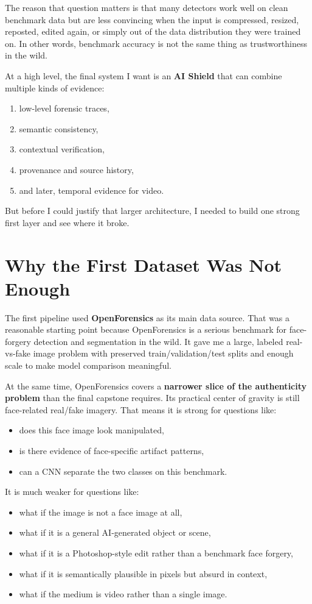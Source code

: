 \documentclass[11pt]{article}
\begin{document}
The reason that question matters is that many detectors work well on clean benchmark data but are less convincing when the input is compressed, resized, reposted, edited again, or simply out of the data distribution they were trained on. In other words, benchmark accuracy is not the same thing as trustworthiness in the wild.

At a high level, the final system I want is an \textbf{AI Shield} that can combine multiple kinds of evidence:
\begin{enumerate}[leftmargin=1.5em]
    \item low-level forensic traces,
    \item semantic consistency,
    \item contextual verification,
    \item provenance and source history,
    \item and later, temporal evidence for video.
\end{enumerate}

But before I could justify that larger architecture, I needed to build one strong first layer and see where it broke.

\section{Why the First Dataset Was Not Enough}

The first pipeline used \textbf{OpenForensics} as its main data source. That was a reasonable starting point because OpenForensics is a serious benchmark for face-forgery detection and segmentation in the wild. It gave me a large, labeled real-vs-fake image problem with preserved train/validation/test splits and enough scale to make model comparison meaningful.

At the same time, OpenForensics covers a \textbf{narrower slice of the authenticity problem} than the final capstone requires. Its practical center of gravity is still face-related real/fake imagery. That means it is strong for questions like:
\begin{itemize}[leftmargin=1.5em]
    \item does this face image look manipulated,
    \item is there evidence of face-specific artifact patterns,
    \item can a CNN separate the two classes on this benchmark.
\end{itemize}

It is much weaker for questions like:
\begin{itemize}[leftmargin=1.5em]
    \item what if the image is not a face image at all,
    \item what if it is a general AI-generated object or scene,
    \item what if it is a Photoshop-style edit rather than a benchmark face forgery,
    \item what if it is semantically plausible in pixels but absurd in context,
    \item what if the medium is video rather than a single image.
\end{itemize}
\end{document}
